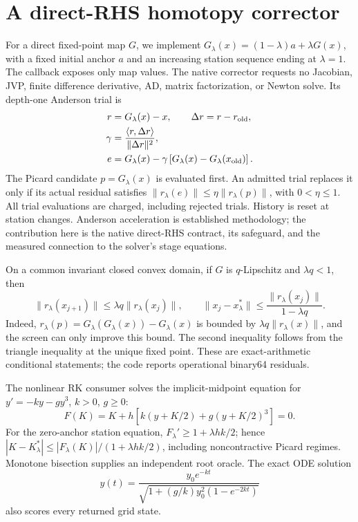 \section{A direct-RHS homotopy corrector}

For a direct fixed-point map $G$, we implement
$G_\lambda(x)=(1-\lambda)a+\lambda G(x)$, with a fixed initial anchor $a$ and
an increasing station sequence ending at $\lambda=1$. The callback exposes
only map values. The native corrector requests no Jacobian, JVP, finite
difference derivative, AD, matrix factorization, or Newton solve. Its
depth-one Anderson trial is
\begin{align}
r&=G_\lambda(x)-x,\qquad \Delta r=r-r_{\rm old},\\
\gamma&=\frac{\langle r,\Delta r\rangle}{\|\Delta r\|^2},\\
e&=G_\lambda(x)-\gamma\left[G_\lambda(x)-G_\lambda(x_{\rm old})\right].
\end{align}
The Picard candidate $p=G_\lambda(x)$ is evaluated first. An admitted trial
replaces it only if its actual residual satisfies
$\|r_\lambda(e)\|\le\eta\|r_\lambda(p)\|$, with $0<\eta\le1$.
All trial evaluations are charged, including rejected trials. History is
reset at station changes. Anderson acceleration is established methodology;
the contribution here is the native direct-RHS contract, its safeguard, and
the measured connection to the solver's stage equations.

On a common invariant closed convex domain, if $G$ is $q$-Lipschitz and
$\lambda q<1$, then
\begin{equation}
\|r_\lambda(x_{j+1})\|\le\lambda q\|r_\lambda(x_j)\|,\qquad
\|x_j-x_\lambda^*\|\le\frac{\|r_\lambda(x_j)\|}{1-\lambda q}.
\end{equation}
Indeed, $r_\lambda(p)=G_\lambda(G_\lambda(x))-G_\lambda(x)$ is bounded by
$\lambda q\|r_\lambda(x)\|$, and the screen can only improve this bound.
The second inequality follows from the triangle inequality at the unique
fixed point. These are exact-arithmetic conditional statements; the code
reports operational binary64 residuals.

The nonlinear RK consumer solves the implicit-midpoint equation for
$y'=-ky-gy^3$, $k>0$, $g\ge0$:
\begin{equation}
F(K)=K+h\left[k(y+K/2)+g(y+K/2)^3\right]=0.
\end{equation}
For the zero-anchor station equation, $F_\lambda'\ge1+\lambda hk/2$;
hence $|K-K_\lambda^*|\le|F_\lambda(K)|/(1+\lambda hk/2)$, including
noncontractive Picard regimes. Monotone bisection supplies an independent
root oracle. The exact ODE solution
\begin{equation}
y(t)=\frac{y_0e^{-kt}}{\sqrt{1+(g/k)y_0^2(1-e^{-2kt})}}
\end{equation}
also scores every returned grid state.

